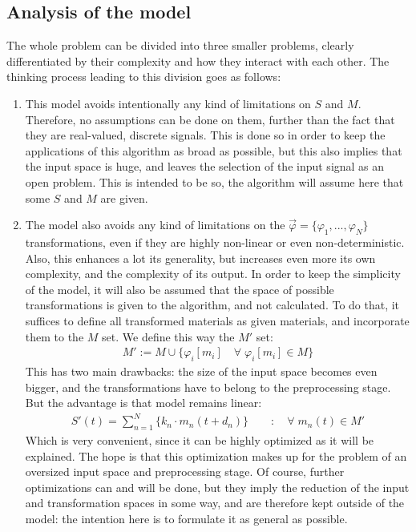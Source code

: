 \documentclass[11pt]{scrartcl} %
\begin{document}
  \subsection*{Analysis of the model}
  The whole problem can be divided into three smaller problems, clearly differentiated by their complexity and how they interact with each other. The thinking process leading to this division goes as follows:
  \begin{enumerate}
  \item This model avoids intentionally any kind of limitations on \(S\) and \(M\). Therefore, no assumptions can be done on them, further than the fact that they are real-valued, discrete signals. This is done so in order to keep the applications of this algorithm as broad as possible, but this also implies that the input space is huge, and leaves the selection of the input signal as an open problem. This is intended to be so, the algorithm will assume here that some \(S\) and \(M\) are given.
  \item The model also avoids any kind of limitations on the \(\vec{\varphi}=\{\varphi_1, ..., \varphi_N\}\) transformations, even if they are highly non-linear or even non-deterministic. Also, this enhances a lot its generality, but increases even more its own complexity, and the complexity of its output. In order to keep the simplicity of the model, it will also be assumed that the space of possible transformations is given to the algorithm, and not calculated. To do that, it suffices to define all transformed materials as given materials, and incorporate them to the \(M\) set. We define this way the \(M'\) set:
    \begin{align*}
    M' := M \cup \{\varphi_i[m_i] \quad\forall\; \varphi_i[m_i]\in M\}
    \end{align*}
    This has two main drawbacks: the size of the input space becomes even bigger, and the transformations have to belong to the preprocessing stage. But the advantage is that model remains linear:
    \begin{align*}
    S'{\scriptstyle (t)} = \sum_{n=1}^N\{k_n\cdot m_n{\scriptstyle (t+d_n)}\} \qquad : \quad \forall\; m_n{\scriptstyle (t)}  \in M'
    \end{align*}
    Which is very convenient, since it can be highly optimized as it will be explained. The hope is that this optimization makes up for the problem of an oversized input space and preprocessing stage. Of course, further optimizations can and will be done, but they imply the reduction of the input and transformation spaces in some way, and are therefore kept outside of the model: the intention here is to formulate it as general as possible.
 
  \end{enumerate}
\end{document}
